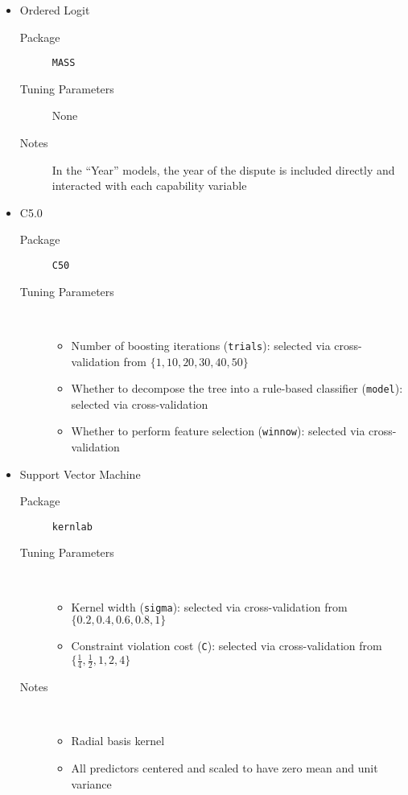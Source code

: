 \begin{itemize}
  \sloppy

  \item Ordered Logit 
  \begin{description}
    \item[Package] \texttt{MASS} 
    \item[Tuning Parameters] None
    \item[Notes] In the ``Year'' models, the year of the dispute is included directly and interacted with each capability variable
  \end{description}

  \item C5.0 
  \begin{description}
    \item[Package] \texttt{C50} 
    \item[Tuning Parameters] ~
    \begin{itemize}
      \item Number of boosting iterations (\texttt{trials}): selected via cross-validation from $\{1, 10, 20, 30, 40, 50\}$
      \item Whether to decompose the tree into a rule-based classifier (\texttt{model}): selected via cross-validation
      \item Whether to perform feature selection (\texttt{winnow}): selected via cross-validation
    \end{itemize}
  \end{description}

  \item Support Vector Machine 
  \begin{description}
    \item[Package] \texttt{kernlab} 
    \item[Tuning Parameters] ~
    \begin{itemize}
      \item Kernel width (\texttt{sigma}): selected via cross-validation from $\{0.2, 0.4, 0.6, 0.8, 1\}$
      \item Constraint violation cost (\texttt{C}): selected via cross-validation from $\{\frac{1}{4}, \frac{1}{2}, 1, 2, 4\}$
    \end{itemize}
    \item[Notes] ~
    \begin{itemize}
      \item Radial basis kernel
      \item All predictors centered and scaled to have zero mean and unit variance
    \end{itemize}
  \end{description}


\end{itemize}
